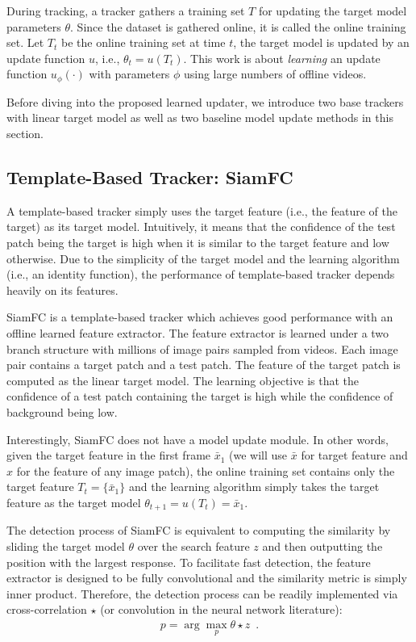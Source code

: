 \documentclass[journal]{IEEEtran}
\begin{document}
During tracking, a tracker gathers a training set $T$ for updating the target model parameters $\theta$. Since the dataset is gathered online, it is called the online training set. Let $T_t$ be the online training set at time $t$, the target model is updated by an update function $u$, i.e., $\theta_t = u(T_t)$. This work is about \emph{learning} an update function $u_\phi(\cdot)$ with parameters $\phi$ using large numbers of offline videos.

Before diving into the proposed learned updater, we introduce two base trackers with linear target model as well as two baseline model update methods in this section. 

\subsection{Template-Based Tracker: SiamFC}
A template-based tracker simply uses the target feature (i.e., the feature of the target) as its target model. Intuitively, it means that the confidence of the test patch being the target is high when it is similar to the target feature and low otherwise. Due to the simplicity of the target model and the learning algorithm (i.e., an identity function), the performance of template-based tracker depends heavily on its features. 

SiamFC\cite{bertinetto2016fully} is a template-based tracker which achieves good performance with an offline learned feature extractor. The feature extractor is learned under a two branch structure with millions of image pairs sampled from videos. Each image pair contains a target patch and a test patch. The feature of the target patch is computed as the linear target model. The learning objective is that the confidence of a test patch containing the target is high while the confidence of background being low.

Interestingly, SiamFC does not have a model update module. In other words, given the target feature in the first frame $\bar{x}_1$ (we will use $\bar{x}$ for target feature and $x$ for the feature of any image patch), the online training set contains only the target feature $T_t = \{\bar{x}_1\}$ and the learning algorithm simply takes the target feature as the target model $\theta_{t+1} = u(T_t) = \bar{x}_1$. 

The detection process of SiamFC is equivalent to computing the similarity by sliding the target model $\theta$ over the search feature $z$ and then outputting the position with the largest response. To facilitate fast detection, the feature extractor is designed to be fully convolutional and the similarity metric is simply inner product. Therefore, the detection process can be readily implemented via cross-correlation $\star$ (or convolution in the neural network literature):
\begin{equation} \label{eq:template-detect}
	\begin{aligned}
		p = \arg\max_{p} \theta \star z \enspace .\\
	\end{aligned}
\end{equation}  
\end{document}
